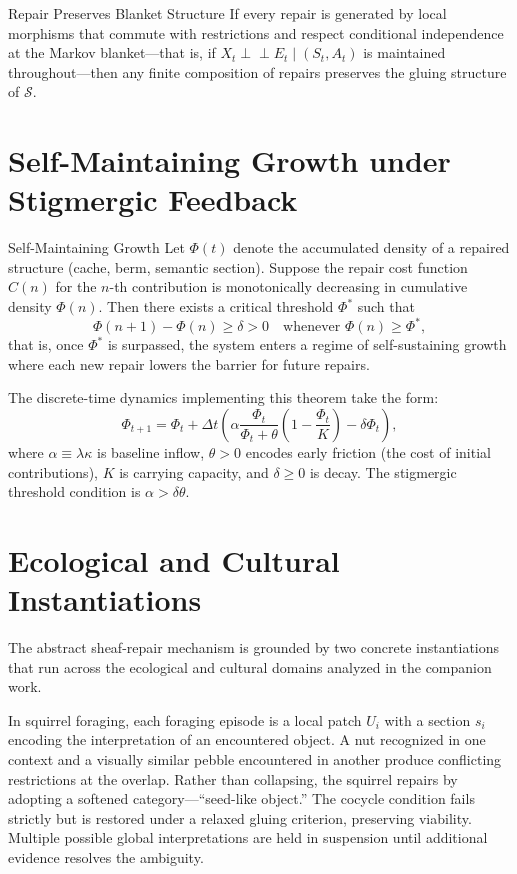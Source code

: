 \begin{proposition}{Repair Preserves Blanket Structure}
If every repair is generated by local morphisms that commute with restrictions and
respect conditional independence at the Markov blanket---that is, if
$X_t \perp\!\!\!\perp E_t \mid (S_t, A_t)$ is maintained throughout---then any
finite composition of repairs preserves the gluing structure of $\mathcal{S}$.
\end{proposition}

\section{Self-Maintaining Growth under Stigmergic Feedback}

\begin{theorem}{Self-Maintaining Growth}
Let $\Phi(t)$ denote the accumulated density of a repaired structure (cache, berm,
semantic section). Suppose the repair cost function $C(n)$ for the $n$-th
contribution is monotonically decreasing in cumulative density $\Phi(n)$. Then
there exists a critical threshold $\Phi^*$ such that
\[
  \Phi(n+1) - \Phi(n) \geq \delta > 0 \quad \text{whenever } \Phi(n) \geq \Phi^*,
\]
that is, once $\Phi^*$ is surpassed, the system enters a regime of self-sustaining
growth where each new repair lowers the barrier for future repairs.
\end{theorem}

The discrete-time dynamics implementing this theorem take the form:
\[
  \Phi_{t+1} = \Phi_t + \Delta t \left(
    \alpha \frac{\Phi_t}{\Phi_t + \theta}
    \left(1 - \frac{\Phi_t}{K}\right) - \delta \Phi_t
  \right),
\]
where $\alpha \equiv \lambda \kappa$ is baseline inflow, $\theta > 0$ encodes early
friction (the cost of initial contributions), $K$ is carrying capacity, and
$\delta \geq 0$ is decay. The stigmergic threshold condition is $\alpha > \delta\theta$.

\section{Ecological and Cultural Instantiations}

The abstract sheaf-repair mechanism is grounded by two concrete instantiations that
run across the ecological and cultural domains analyzed in the companion work.

In squirrel foraging, each foraging episode is a local patch $U_i$ with a section
$s_i$ encoding the interpretation of an encountered object. A nut recognized in
one context and a visually similar pebble encountered in another produce conflicting
restrictions at the overlap. Rather than collapsing, the squirrel repairs by adopting
a softened category---``seed-like object.'' The cocycle condition fails strictly but
is restored under a relaxed gluing criterion, preserving viability. Multiple possible
global interpretations are held in suspension until additional evidence resolves the
ambiguity.

